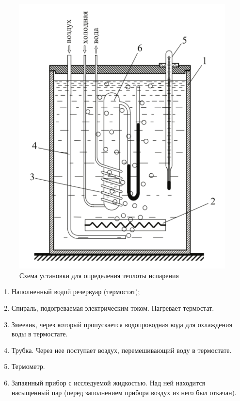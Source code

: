\documentclass[a4paper,12pt]{article} %
\begin{document}
\begin{figure}[h]
  \centering
  \includegraphics[scale = 0.5]{drawing1.png}
  \caption{Схема установки для определения теплоты испарения}
  \label{fig:drawing1}
\end{figure}

\begin{enumerate}
  \item Наполненный водой резервуар (термостат);
  \item Спираль, подогреваемая электрическим током. Нагревает термостат.
  \item Змеевик, через который пропускается водопроводная вода для охлаждения воды в термостате.
  \item Трубка. Через нее поступает воздух, перемешивающий воду в термостате.
  \item Термометр.
  \item Запаянный прибор с исследуемой жидкостью. Над ней находится насыщенный пар (перед заполнением прибора воздух из него был откачан).
\end{enumerate}
\end{document}
